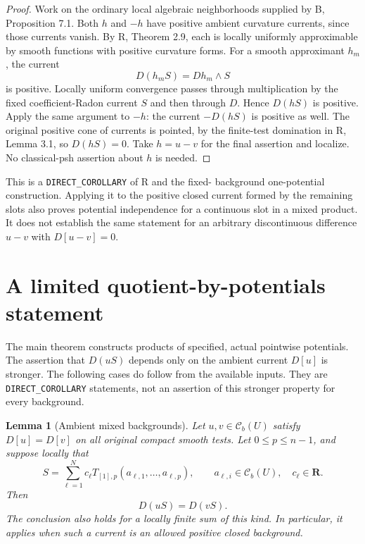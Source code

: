 \documentclass[11pt,a4paper]{article}
\numberwithin{equation}{section}
\newtheorem{lemma}[theorem]{Lemma}
\theoremstyle{definition}
\theoremstyle{remark}
\newcommand{\Cb}{\mathcal C_b}
\begin{document}
\begin{proof}
Work on the ordinary local algebraic neighborhoods supplied by
\textup{B}, Proposition 7.1. Both $h$ and $-h$ have positive ambient
curvature currents, since those currents vanish. By \textup{R},
Theorem 2.9, each is locally uniformly approximable by smooth
functions with positive curvature forms. For a smooth approximant
$h_m$, the current
\[
 D(h_mS)=Dh_m\wedge S
\]
is positive. Locally uniform convergence passes through multiplication
by the fixed coefficient-Radon current $S$ and then through $D$.
Hence $D(hS)$ is positive. Apply the same argument to $-h$: the
current $-D(hS)$ is positive as well. The original positive cone of
currents is pointed, by the finite-test domination in R, Lemma 3.1,
so $D(hS)=0$. Take $h=u-v$ for the final assertion and localize.
No classical-psh assertion about $h$ is needed.
\end{proof}

This is a \texttt{DIRECT\_COROLLARY} of \textup{R} and the fixed-
background one-potential construction. Applying it to the positive
closed current formed by the remaining slots also proves potential
independence for a continuous slot in a mixed product. It does not
establish the same statement for an arbitrary discontinuous
difference $u-v$ with $D[u-v]=0$.




\section{A limited quotient-by-potentials statement}
\label{sec:potential-independence-scope}

The main theorem constructs products of specified, actual pointwise
potentials. The assertion that $D(uS)$ depends only on the ambient
current $D[u]$ is stronger. The following cases do follow from the
available inputs. They are \texttt{DIRECT\_COROLLARY} statements, not
an assertion of this stronger property for every background.

\begin{lemma}[Ambient mixed backgrounds]
\label{lem:potential-independence-ambient-mixed}
Let $u,v\in\Cb(U)$ satisfy $D[u]=D[v]$ on all original compact smooth
tests. Let $0\leq p\leq n-1$, and suppose locally that
\[
 S=\sum_{\ell=1}^{N}c_\ell
      T_{[1],p}(a_{\ell,1},\ldots,a_{\ell,p}),
 \qquad a_{\ell,i}\in\Cb(U),\quad c_\ell\in\mathbf R.
\]
Then
\[
 D(uS)=D(vS).
\]
The conclusion also holds for a locally finite sum of this kind.
In particular, it applies when such a current is an allowed positive
closed background.
\end{lemma}
\end{document}
